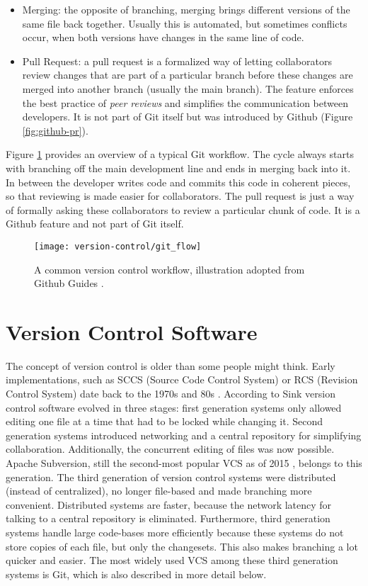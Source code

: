 \begin{itemize}
  \item Merging: the opposite of branching, merging brings different versions of the same file back together. Usually this is automated, but sometimes conflicts occur, when both versions have changes in the same line of code.
  \item Pull Request: a pull request is a formalized way of letting collaborators review changes that are part of a particular branch before these changes are merged into another branch (usually the main branch). The feature enforces the best practice of \textit{peer reviews} and simplifies the communication between developers. It is not part of Git itself but was introduced by Github (Figure \ref{fig:github-pr}).
\end{itemize}

Figure \ref{fig:git-workflow} provides an overview of a typical Git workflow. The cycle always starts with branching off the main development line and ends in merging back into it. In between the developer writes code and commits this code in coherent pieces, so that reviewing is made easier for collaborators. The pull request is just a way of formally asking these collaborators to review a particular chunk of code. It is a Github feature and not part of Git itself.


\begin{figure}[h]
 \centering
 \texttt{[image: version-control/git\_flow]}
 \caption{A common version control workflow, illustration adopted from Github Guides \cite{_understanding_????}.}
 \label{fig:git-workflow}
\end{figure}


\section{Version Control Software}
The concept of version control is older than some people might think. Early implementations, such as SCCS (Source Code Control System) or RCS (Revision Control System) date back to the 1970s and 80s \cite{_gnu_????,rochkind_source_1975}. According to Sink \cite{sink_version_2011} version control software evolved in three stages: first generation systems only allowed editing one file at a time that had to be locked while changing it. Second generation systems introduced networking and a central repository for simplifying collaboration. Additionally, the concurrent editing of files was now possible. Apache Subversion, still the second-most popular VCS as of 2015 \cite{_stack_2015}, belongs to this generation. The third generation of version control systems were distributed (instead of centralized), no longer file-based and made branching more convenient. Distributed systems are faster, because the network latency for talking to a central repository is eliminated. Furthermore, third generation systems handle large code-bases more efficiently because these systems do not store copies of each file, but only the changesets. This also makes branching a lot quicker and easier. The most widely used VCS among these third generation systems is Git, which is also described in more detail below.

